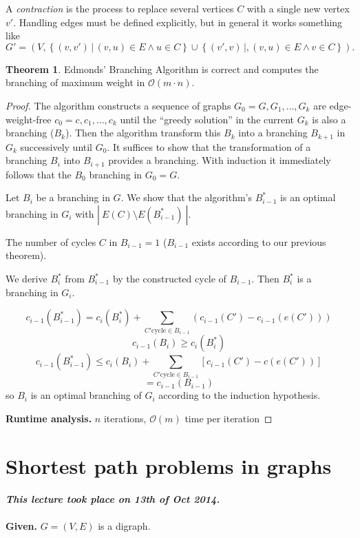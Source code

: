 \documentclass[a4paper]{article}
\theoremstyle{definition}
\newtheorem{theorem}{Theorem}
\newcommand{\card}[1]{\left|\:\!#1\:\!\right|}
\newcommand{\set}[1]{\left\{#1\right\}}
\newcommand{\given}[1]{\textbf{Given.} #1\par}
\newcommand{\dateref}[1]{\paragraph{\textit{This lecture took place on #1.}}}
\begin{document}
A \emph{contraction} is the process to replace several vertices $C$ with a single
new vertex $v'$. Handling edges must be defined explicitly, but in general it works
something like
\[ G' = (V, \set{(v, v') \,|\, (v, u) \in E \land u \in C}
   \cup \set{(v', v) \,|, (v, u) \in E \land v \in C}). \]

\begin{theorem}\label{satz-2.11}
  Edmonds' Branching Algorithm is correct and computes the branching of
  maximum weight in $\mathcal{O}(m\cdot n)$.
\end{theorem}

\begin{proof}
The algorithm constructs a sequence of graphs $G_0 = G, G_1, \ldots, G_k$ are edge-weight-free $c_0 = c, c_1, \ldots, c_k$ until the ``greedy solution'' in the current $G_k$ is also a branching ($B_k$). Then the algorithm transform this $B_k$ into a branching $B_{k+1}$ in $G_k$ successively until $G_0$. It suffices to show that the transformation of a branching $B_i$ into $B_{i+1}$ provides a branching. With induction it immediately follows that the $B_0$ branching in $G_0 = G$.

Let $B_i$ be a branching in $G$. We show that the algorithm's $B^*_{i-1}$ is an optimal branching in $G_i$ with $\card{E(C) \setminus E(B^*_{i-1})}$.

The number of cycles $C$ in $B_{i-1} = 1$ ($B_{i-1}$ exists according to our previous theorem).

We derive $B^*_i$ from $B^*_{i-1}$ by the constructed cycle of $B_{i-1}$. Then $B^*_i$ is a branching in $G_i$.

\[
  c_{i-1}(B_{i-1}^*) = c_i(B_i^*) + \sum_{C' \text{cycle} \in B_{i-1}}(c_{i-1}(C') - c_{i-1}(e(C')))
\] \[
  c_{i-1}(B_i) \geq c_i(B^*_i)
\] \[
  c_{i-1}(B_{i-1}^*) \leq c_i(B_i) + \sum_{C' \text{cycle} \in B_{i-1}} \left[ c_{i-1}(C') - c(e(C')) \right]
\] \[
  = c_{i-1}(B_{i-1})
\]
so $B_i$ is an optimal branching of $G_i$ according to the induction hypothesis.

\textbf{Runtime analysis.}
  $n$ iterations, $\mathcal{O}(m)$ time per iteration
\end{proof}

\section{Shortest path problems in graphs}
%
\dateref{13th of Oct 2014}

\given{$G = (V, E)$ is a digraph.}
\end{document}
